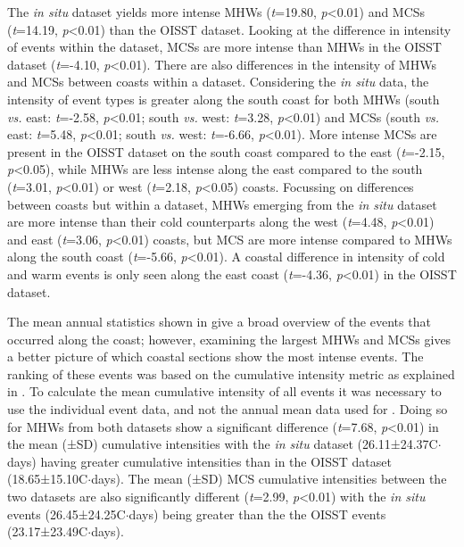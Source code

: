 \documentclass[a4paper,10pt,review]{elsarticle}
\begin{document}
The \emph{in situ} dataset yields more intense MHWs (\emph{t}=19.80, \emph{p}<0.01) and MCSs (\emph{t}=14.19, \emph{p}<0.01) than the OISST dataset. Looking at the difference in intensity of events within the dataset, MCSs are more intense than MHWs in the OISST dataset (\emph{t}=-4.10, \emph{p}<0.01). There are also differences in the intensity of MHWs and MCSs between coasts within a dataset. Considering the \emph{in situ} data, the intensity of event types is greater along the south coast for both MHWs (south \emph{vs.} east: \emph{t}=-2.58, \emph{p}<0.01; south \emph{vs.} west: \emph{t}=3.28, \emph{p}<0.01) and MCSs (south \emph{vs.} east: \emph{t}=5.48, \emph{p}<0.01; south \emph{vs.} west: \emph{t}=-6.66, \emph{p}<0.01). More intense MCSs are present in the OISST dataset on the south coast compared to the east (\emph{t}=-2.15, \emph{p}<0.05), while MHWs are less intense along the east compared to the south (\emph{t}=3.01, \emph{p}<0.01) or west (\emph{t}=2.18, \emph{p}<0.05) coasts. Focussing on differences between coasts but within a dataset, MHWs emerging from the \emph{in situ} dataset are more intense than their cold counterparts along the west (\emph{t}=4.48, \emph{p}<0.01) and east (\emph{t}=3.06, \emph{p}<0.01) coasts, but MCS are more intense compared to MHWs along the south coast (\emph{t}=-5.66, \emph{p}<0.01). A coastal difference in intensity of cold and warm events is only seen along the east coast (\emph{t}=-4.36, \emph{p}<0.01) in the OISST dataset.

The mean annual statistics shown in  give a broad overview of the events that occurred along the coast; however, examining the largest MHWs and MCSs gives a better picture of which coastal sections show the most intense events. The ranking of these events was based on the cumulative intensity metric as explained in . To calculate the mean cumulative intensity of all events it was necessary to use the individual event data, and not the annual mean data used for . Doing so for MHWs from both datasets show a significant difference (\emph{t}=7.68, \emph{p}<0.01) in the mean (±SD) cumulative intensities with the \emph{in situ} dataset (26.11±24.37\degree C$\cdot$days) having greater cumulative intensities than in the OISST dataset (18.65±15.10\degree C$\cdot$days). The mean (±SD) MCS cumulative intensities between the two datasets are also significantly different (\emph{t}=2.99, \emph{p}<0.01) with the \emph{in situ} events (26.45±24.25\degree C$\cdot$days) being greater than the the OISST events (23.17±23.49\degree C$\cdot$days).
\end{document}
